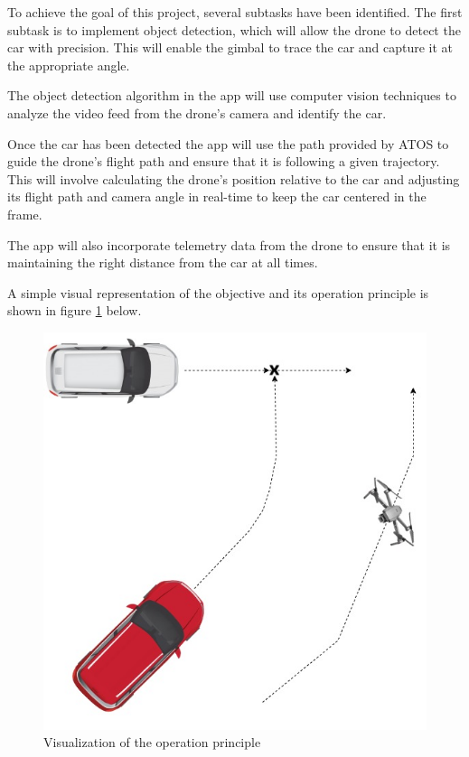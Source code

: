 To achieve the goal of this project, several subtasks have been identified. The first subtask is to implement object detection, which will allow the drone to detect the car with precision. This will enable the gimbal to trace the car and capture it at the appropriate angle.

The object detection algorithm in the app will use computer vision techniques to analyze the video feed from the drone's camera and identify the car. 

Once the car has been detected the app will use the path provided by ATOS to guide the drone's flight path and ensure that it is following a given trajectory. This will involve calculating the drone's position relative to the car and adjusting its flight path and camera angle in real-time to keep the car centered in the frame.

The app will also incorporate telemetry data from the drone to ensure that it is maintaining the right distance from the car at all times. 

A simple visual representation of the objective and its operation principle is shown in figure \ref{fig:visualization} below.

\begin{figure}[H]
  \centering
  \includegraphics[width=0.75\columnwidth]{figure/traj.jpg}
  \caption{Visualization of the operation principle}
  \label{fig:visualization}
\end{figure}



